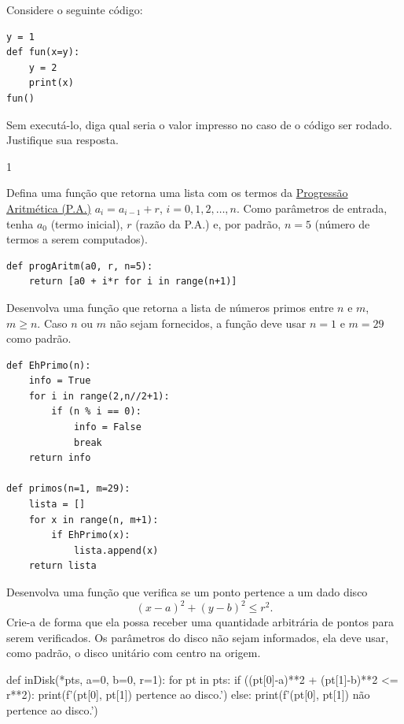 \begin{exer}
  Considere o seguinte código:
\begin{lstlisting}
y = 1
def fun(x=y):
    y = 2
    print(x)
fun()
\end{lstlisting}
  Sem executá-lo, diga qual seria o valor impresso no caso de o código ser rodado. Justifique sua resposta.
\end{exer}
\begin{resp}
  1
\end{resp}

\begin{exer}
  Defina uma função {\python} que retorna uma lista com os termos da \href{https://pt.wikipedia.org/wiki/Progress\%C3\%A3o_aritm\%C3\%A9tica}{Progressão Aritmética (P.A.)} $a_i = a_{i-1} + r$, $i = 0, 1, 2, \dotsc, n$. Como parâmetros de entrada, tenha $a_0$ (termo inicial), $r$ (razão da P.A.) e, por padrão, $n = 5$ (número de termos a serem computados).
\end{exer}
\begin{resp}
\begin{lstlisting}
def progAritm(a0, r, n=5):
    return [a0 + i*r for i in range(n+1)]
\end{lstlisting}
\end{resp}

\begin{exer}
  Desenvolva uma função que retorna a lista de números primos entre $n$ e $m$, $m\geq n$. Caso $n$ ou $m$ não sejam fornecidos, a função deve usar $n=1$ e $m=29$ como padrão.
\end{exer}
\begin{resp}
\begin{lstlisting}
def EhPrimo(n):
    info = True
    for i in range(2,n//2+1):
        if (n % i == 0):
            info = False
            break
    return info

def primos(n=1, m=29):
    lista = []
    for x in range(n, m+1):
        if EhPrimo(x):
            lista.append(x)
    return lista
\end{lstlisting}
\end{resp}

\begin{exer}
  Desenvolva uma função que verifica se um ponto pertence a um dado disco
  \begin{equation}
    (x-a)^2 + (y-b)^2 \leq r^2.
  \end{equation}
  Crie-a de forma que ela possa receber uma quantidade arbitrária de pontos para serem verificados. Os parâmetros do disco não sejam informados, ela deve usar, como padrão, o disco unitário com centro na origem.
\end{exer}
\begin{resp}
def inDisk(*pts, a=0, b=0, r=1):
    for pt in pts:
        if ((pt[0]-a)**2 + (pt[1]-b)**2 <= r**2):
            print(f'({pt[0]}, {pt[1]}) pertence ao disco.')
        else:
            print(f'({pt[0]}, {pt[1]}) não pertence ao disco.')
\end{resp}